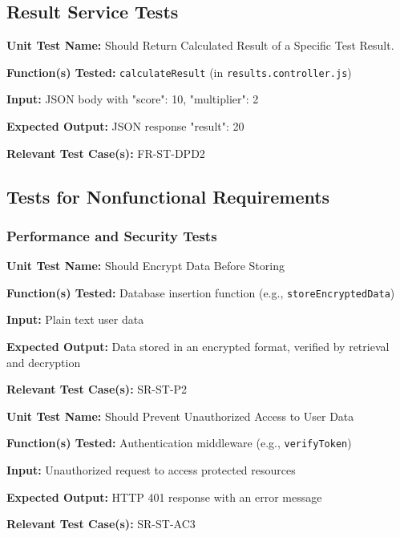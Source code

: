 \documentclass[12pt, titlepage]{article}
\begin{document}
\subsection*{Result Service Tests}

\begin{mdframed}[linewidth=0.5mm]
\textbf{Unit Test Name:} Should Return Calculated Result of a Specific Test Result. \par
\textbf{Function(s) Tested:} \texttt{calculateResult} (in \texttt{results.controller.js}) \par
\textbf{Input:} JSON body with {"score": 10, "multiplier": 2} \par
\textbf{Expected Output:} JSON response {"result": 20} \par
\textbf{Relevant Test Case(s):} FR-ST-DPD2
\end{mdframed}

\subsection{Tests for Nonfunctional Requirements}

\subsubsection{Performance and Security Tests}

\begin{mdframed}[linewidth=0.5mm]
\textbf{Unit Test Name:} Should Encrypt Data Before Storing \par
\textbf{Function(s) Tested:} Database insertion function (e.g., \texttt{storeEncryptedData}) \par
\textbf{Input:} Plain text user data \par
\textbf{Expected Output:} Data stored in an encrypted format, verified by retrieval and decryption \par
\textbf{Relevant Test Case(s):} SR-ST-P2
\end{mdframed}

\begin{mdframed}[linewidth=0.5mm]
\textbf{Unit Test Name:} Should Prevent Unauthorized Access to User Data \par
\textbf{Function(s) Tested:} Authentication middleware (e.g., \texttt{verifyToken}) \par
\textbf{Input:} Unauthorized request to access protected resources \par
\textbf{Expected Output:} HTTP 401 response with an error message \par
\textbf{Relevant Test Case(s):} SR-ST-AC3
\end{mdframed}
\end{document}
